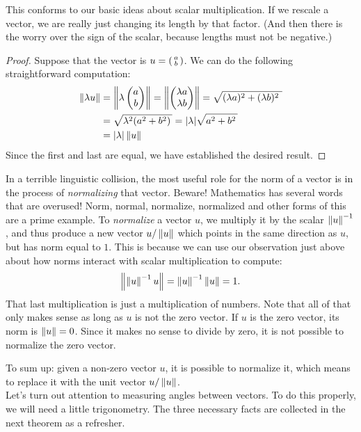 \documentclass[elementsmain.tex]{subfiles}
\begin{document}
This conforms to our basic ideas about scalar multiplication. If we rescale a vector, we are really just changing its length by that factor. (And then there is the worry over the sign of the scalar, because lengths must not be negative.)


\begin{proof}
Suppose that the vector is $u =\left(\begin{smallmatrix} a \\ b \end{smallmatrix}\right) $.
We can do the following straightforward computation:
\[
\begin{split}
\left\|\lambda u\right\| & = \left\| \lambda \begin{pmatrix} a \\ b \end{pmatrix}\right\| = \left\| \begin{pmatrix} \lambda a \\ \lambda b \end{pmatrix} \right\| = \sqrt{ (\lambda a)^2 + (\lambda b)^2\ } \\
& = \sqrt{\lambda^2(a^2+b^2)\,} = |\lambda| \sqrt{a^2+b^2\,}\\
& = |\lambda| \left\|u\right\|
\end{split}
\]
Since the first and last are equal, we have established the desired result.
\end{proof}


In a terrible linguistic collision, the most useful role for the norm of a vector is in the process of \emph{normalizing} that vector. 
Beware! Mathematics has several words that are overused! 
Norm, normal, normalize, normalized and other forms of this are a prime example.
To \emph{normalize} a vector $u$, we multiply it by the scalar $\left\|u\right\|^{-1}$, and thus produce a new vector $u/\left\|u\right\|$ which points in the same direction as $u$, but has norm equal to $1$. This is because we can use our observation just above about how norms interact with scalar multiplication to compute:
\[
\left\|\left\|u\right\|^{-1} u\right\| = \left\|u\right\|^{-1}\left\|u\right\|  = 1.
\]
That last multiplication is just a multiplication of numbers.
Note that all of that only makes sense as long as $u$ is not the zero vector. If $u$ is the zero vector, its norm is $\left\|u\right\|=0$. Since it makes no sense to divide by zero, it is not possible to normalize the zero vector.

To sum up: given a non-zero vector $u$, it is possible to normalize it, which means to replace it with the unit vector $u/\left\|u\right\|$.\\


Let's turn out attention to measuring angles between vectors. To do this properly, we will need a little trigonometry. The three necessary facts are collected in the next theorem as a refresher. 
\end{document}
